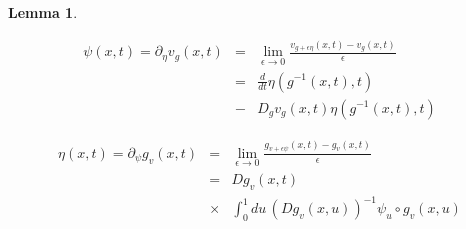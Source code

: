 \documentclass[final, paper=letter,5p,times,twocolumn]{elsarticle}
\theoremstyle{definition}
\newtheorem{lemma}[theorem]{Lemma}
\begin{document}
\begin{lemma}
\label{lemma}

\begin{eqnarray*}
\psi(x,t) = \partial_{\eta} v_{g}(x,t) & = & \underset{\epsilon \rightarrow 0}{\lim} \frac{v_{g+\epsilon \eta}(x,t) - v_{g}(x,t)}{\epsilon} \\
& = & \frac{d}{dt} \eta(g^{-1}(x,t),t) \\
& - & D_{g} v_{g}(x,t) \eta (g^{-1}(x,t),t)
\end{eqnarray*}

\begin{equation}
  \begin{array}{lcl}
\eta(x,t) = \partial_{\psi} g_{v}(x,t) & = & \underset{\epsilon \rightarrow 0}{\lim} \frac{g_{v + \epsilon \psi}(x,t) - g_{v}(x,t)}{\epsilon} \\
& = & Dg_{v}(x,t) \\
& \times & \int_{0}^{1} du \, (Dg_{v}(x,u))^{-1} \psi_{u} \circ g_{v}(x,u)
\end{array}
\label{lemma_eq}
\end{equation}
\end{lemma}
\end{document}
